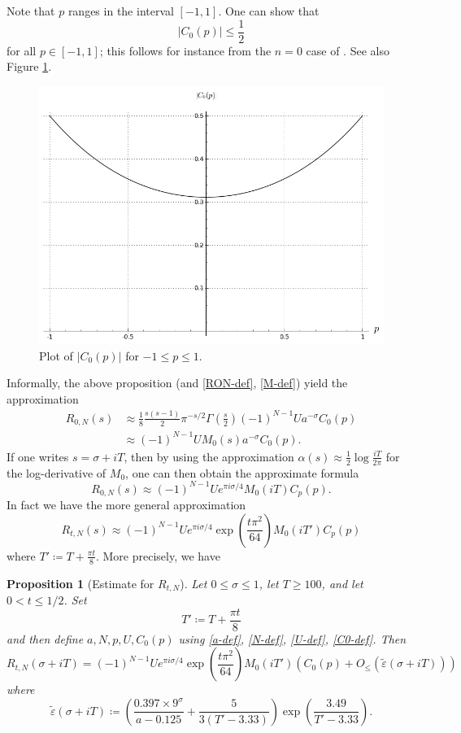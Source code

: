 \documentclass[a4paper,11pt,twoside]{amsart}
\newtheorem{proposition}[theorem]{Proposition}
\newcommand\eps{\varepsilon}
\begin{document}
Note that $p$ ranges in the interval $[-1,1]$.  One can show that 
\begin{equation}\label{cop}
|C_0(p)| \leq \frac{1}{2}
\end{equation}
for all $p \in [-1,1]$; this follows for instance from the $n=0$ case of \cite[Theorem 6.1]{arias}.  See also Figure \ref{c0p}.

\begin{figure}[ht!]
  \includegraphics[width=0.7\linewidth]{C0_p.png}
  \caption{Plot of $|C_0(p)|$ for $-1 \leq p \leq 1$.}
	\label{c0p}
\end{figure}

Informally, the above proposition (and \eqref{RON-def}, \eqref{M-def}) yield the approximation
\begin{align*}
 R_{0,N}(s) &\approx \frac{1}{8} \frac{s(s-1)}{2} \pi^{-s/2} \Gamma\left(\frac{s}{2}\right) (-1)^{N-1} U a^{-\sigma} C_0(p) \\
&\approx (-1)^{N-1} U M_0(s) a^{-\sigma} C_0(p).
\end{align*}
If one writes $s = \sigma+iT$, then by using the approximation $\alpha(s) \approx \frac{1}{2} \log \frac{iT}{2\pi}$ for the log-derivative of $M_0$, one can then obtain the approximate formula
$$ R_{0,N}(s) \approx (-1)^{N-1} U e^{\pi i \sigma/4} M_0(iT) C_p(p).$$
In fact we have the more general approximation
$$ R_{t,N}(s) \approx (-1)^{N-1} U e^{\pi i \sigma/4} \exp\left( \frac{t \pi^2}{64}\right) M_0(iT') C_p(p)$$
where $T' \coloneqq T + \frac{\pi t}{8}$.  More precisely, we have

\begin{proposition}[Estimate for $R_{t,N}$]\label{RTN-prop}  Let $0 \leq \sigma \leq 1$, let $T \geq 100$, and let $0 < t \leq 1/2$.  Set
$$ T' \coloneqq T + \frac{\pi t}{8} $$
and then define $a,N,p,U,C_0(p)$ using \eqref{a-def}, \eqref{N-def}, \eqref{U-def}, \eqref{C0-def}.
Then 
$$
 R_{t,N}(\sigma+iT) = (-1)^{N-1} U e^{\pi i \sigma/4} \exp\left( \frac{t \pi^2}{64}\right) M_0(iT') \left( C_0(p) + O_{\leq}( \tilde \eps(\sigma+iT))\right)$$
where
\begin{equation}\label{epsp-def}
 \tilde \eps(\sigma+iT) \coloneqq \left(\frac{0.397 \times 9^\sigma}{a-0.125} + \frac{5}{3(T'-3.33)}\right) \exp\left( \frac{3.49}{T'-3.33} \right).
\end{equation}
\end{proposition}
\end{document}

